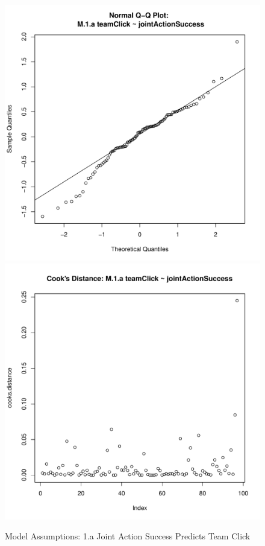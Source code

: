 \documentclass[12pt]{report}
\begin{document}
{\begin{figure}[htbp]
    \includegraphics[scale =.4]{../images/MLM1aQQPlot.pdf}
    \includegraphics[scale =.4]{../images/MLM1aCooksD.pdf}
    \caption{Model Assumptions: 1.a Joint Action Success Predicts Team Click}
    \label{fig:MLM1aAssumptions}
\end{figure}



}
\end{document}
